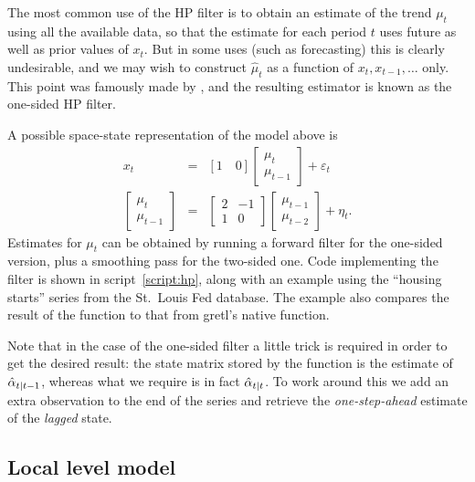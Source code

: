 The most common use of the HP filter is to obtain an estimate of the
trend $\mu_t$ using all the available data, so that the estimate for
each period $t$ uses future as well as prior values of $x_t$. But in
some uses (such as forecasting) this is clearly undesirable, and we
may wish to construct $\hat{\mu}_t$ as a function of
$x_t, x_{t-1}, \ldots$ only. This point was famously made by
\cite{stock-watson1999}, and the resulting estimator is known as the
one-sided HP filter.

A possible space-state representation of the model above is
\begin{eqnarray*}
  x_t & = & [1 \quad 0]
            \left[ \begin{array}{c} \mu_t \\ \mu_{t-1}\end{array}\right]
  + \varepsilon_t \\
  \left[ \begin{array}{c} \mu_t \\ \mu_{t-1}\end{array}\right] & = &
  \left[ \begin{array}{rr} 2 & -1 \\ 1 & 0 \end{array}\right]
  \left[ \begin{array}{c} \mu_{t-1} \\ \mu_{t-2}\end{array}\right] +
  \eta_t .
\end{eqnarray*}
Estimates for $\mu_t$ can be obtained by running a forward filter for
the one-sided version, plus a smoothing pass for the two-sided
one. Code implementing the filter is shown in script~\ref{script:hp},
along with an example using the ``housing starts'' series from the
St.~Louis Fed database. The example also compares the result of the
function to that from gretl's native  function.

Note that in the case of the one-sided filter a little trick is
required in order to get the desired result: the state matrix stored
by the  function is the estimate of
$\hat{\alpha}_{t|t-1}$, whereas what we require is in fact
$\hat{\alpha}_{t|t}$. To work around this we add an extra
observation to the end of the series and retrieve the
\emph{one-step-ahead} estimate of the \emph{lagged} state.

\subsection{Local level model}
\label{sec:example_loclev}

